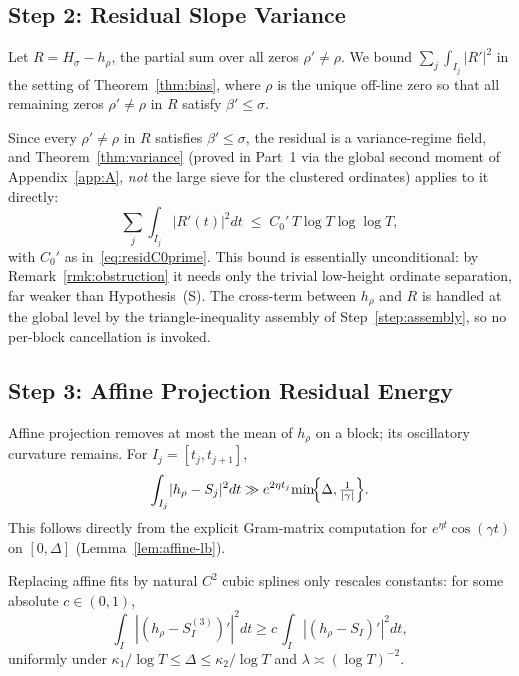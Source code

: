 \subsection{Step 2: Residual Slope Variance}\label{step:residual-variance}

Let $R=H_\sigma-h_\rho$, the partial sum over all zeros $\rho'\ne\rho$.
We bound $\sum_j\int_{I_j}|R'|^2$ in the setting of
Theorem~\ref{thm:bias}, where $\rho$ is the unique off-line zero so that
all remaining zeros $\rho'\ne\rho$ in $R$ satisfy $\beta'\le\sigma$.

Since every $\rho'\ne\rho$ in $R$ satisfies $\beta'\le\sigma$, the residual is a
variance-regime field, and Theorem~\ref{thm:variance} (proved in Part~1 via the
global second moment of Appendix~\ref{app:A}, \emph{not} the large sieve for the
clustered ordinates) applies to it directly:
\begin{equation}
\sum_j\!\int_{I_j}\!|R'(t)|^2dt
   \;\le\; C_0'\,T\log T\log\log T,
\label{eq:residual-variance}
\end{equation}
with $C_0'$ as in~\eqref{eq:residC0prime}.  This bound is essentially
unconditional: by Remark~\ref{rmk:obstruction} it needs only the trivial
low-height ordinate separation, far weaker than Hypothesis~(S).  The cross-term
between $h_\rho$ and $R$ is handled at the global level by the triangle-inequality
assembly of Step~\ref{step:assembly}, so no per-block cancellation is invoked.

\subsection{Step 3: Affine Projection Residual Energy}\label{step:affine-energy}

Affine projection removes at most the mean of $h_\rho$ on a block; its oscillatory curvature remains.
For $I_j=[t_j,t_{j+1}]$,
\begin{equation}
\int_{I_j}\!|h_\rho-S_j|^2dt
   \gg e^{2\eta t_j}\!\min\!\Bigl\{\Delta,\tfrac{1}{|\gamma|}\Bigr\}.
\label{eq:affine-energy}
\end{equation}
This follows directly from the explicit Gram-matrix computation for
$e^{\eta t}\cos(\gamma t)$ on $[0,\Delta]$ (Lemma~\ref{lem:affine-lb}).

\begin{remark}\label{rmk:spline}
Replacing affine fits by natural $C^2$ cubic splines only rescales constants:
for some absolute $c\in(0,1)$,
\[
\int_I |(h_\rho-S_I^{(3)})'|^2 dt
   \ge c\,\int_I |(h_\rho-S_I)'|^2 dt,
\]
uniformly under $\kappa_1/\log T\le\Delta\le\kappa_2/\log T$
and $\lambda\asymp(\log T)^{-2}$.
\end{remark}

